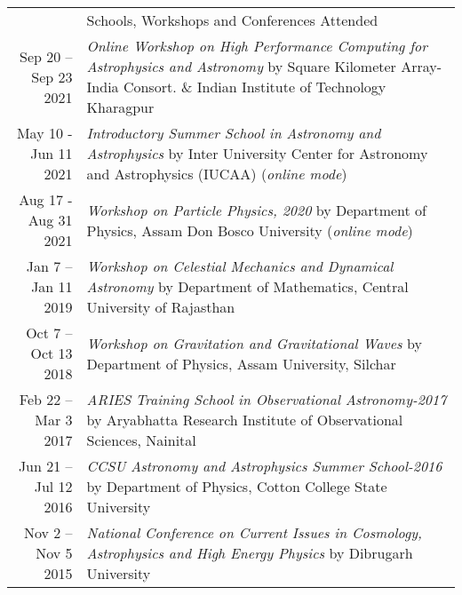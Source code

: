\documentclass[a4paper, 11pt]{article}
\newcommand{\headingfont}{\Large\color{Bittersweet}}
\newenvironment{SectionTable}[1]{
	\renewcommand*{\arraystretch}{1.7}
	\setlength{\tabcolsep}{10pt}
	\begin{longtable}{Rp{5.2in}} & #1 \\}
{\end{longtable}\vspace{-.3cm}}
\begin{document}
\begin{SectionTable}{\headingfont Schools, Workshops and Conferences Attended}
Sep 20 -- Sep 23 2021 & 
\textit{Online Workshop on High Performance Computing for Astrophysics and Astronomy} 
by Square Kilometer Array- India Consort. \& Indian Institute of Technology Kharagpur
 \\

May 10 - Jun 11 2021 &
\textit{Introductory Summer School in Astronomy and Astrophysics} 
by Inter University Center for Astronomy and Astrophysics (IUCAA) (\textit{online mode})
\\

Aug 17 - Aug 31 2021 &
\textit{Workshop on Particle Physics, 2020} 
by Department of Physics, Assam Don Bosco University (\textit{online mode})
\\

Jan 7 -- Jan 11 2019 &
\textit{Workshop on Celestial Mechanics and Dynamical Astronomy} 
by Department of Mathematics, Central University of Rajasthan
\\

Oct 7 -- Oct 13 2018 &
\textit{Workshop on Gravitation and Gravitational Waves} 
by Department of Physics, Assam University, Silchar
\\

Feb 22 -- Mar 3 2017 &
\textit{ARIES Training School in Observational Astronomy-2017} 
by Aryabhatta Research Institute of Observational Sciences, Nainital
\\

Jun 21 -- Jul 12 2016 &
\textit{CCSU Astronomy and Astrophysics Summer School-2016} 
by Department of Physics, Cotton College State University
\\

Nov 2 -- Nov 5 2015 &
\textit{National Conference on Current Issues in Cosmology, Astrophysics and High Energy Physics} 
by Dibrugarh University
\\
\end{SectionTable}


\end{document}
